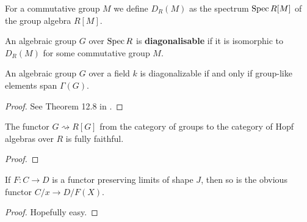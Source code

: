 \begin{definition}
  \label{0-spec-grp-alg}
  \leanok

  For a commutative group $M$ we define $D_R(M)$ as the spectrum $\operatorname{Spec} R[M]$ of the group algebra $R[M]$.
\end{definition}


\begin{definition}
  \label{0-diag}

  An algebraic group $G$ over $\operatorname{Spec} R$ is {\bf diagonalisable}
  if it is isomorphic to $D_R(M)$ for some commutative group $M$.
\end{definition}


\begin{theorem}
  \label{0-diag-iff-grp-like-span}
  \leanok

  An algebraic group $G$ over a field $k$ is diagonalizable if and only if group-like elements span $\Gamma(G)$.
\end{theorem}
\begin{proof}

  See Theorem 12.8 in \cite{Milne_2017}.
\end{proof}


\begin{proposition}
  \label{0-full-grp-hopf-alg}
  \uses{}

  The functor $G \rightsquigarrow R[G]$ from the category of groups to the category of Hopf algebras over $R$ is fully faithful.
\end{proposition}
\begin{proof}

\end{proof}


\begin{proposition}
  \label{0-over-lim}
  \uses{}
  \leanok

  If $F : C \to D$ is a functor preserving limits of shape $J$, then so is the obvious functor $C / x \to D / F(X)$.
\end{proposition}
\begin{proof}
  \uses{}

  Hopefully easy.
\end{proof}


